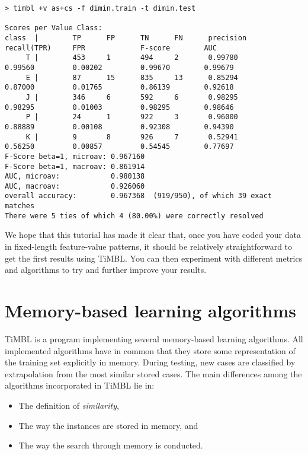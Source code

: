 \documentclass{book}
\begin{document}
{\footnotesize
\begin{verbatim}
> timbl +v as+cs -f dimin.train -t dimin.test

Scores per Value Class:
class  |        TP      FP      TN      FN      precision       recall(TPR)     FPR             F-score        AUC
     T |        453     1       494     2       0.99780         0.99560         0.00202         0.99670        0.99679
     E |        87      15      835     13      0.85294         0.87000         0.01765         0.86139        0.92618
     J |        346     6       592     6       0.98295         0.98295         0.01003         0.98295        0.98646
     P |        24      1       922     3       0.96000         0.88889         0.00108         0.92308        0.94390
     K |        9       8       926     7       0.52941         0.56250         0.00857         0.54545        0.77697
F-Score beta=1, microav: 0.967160
F-Score beta=1, macroav: 0.861914
AUC, microav:            0.980138
AUC, macroav:            0.926060
overall accuracy:        0.967368  (919/950), of which 39 exact matches 
There were 5 ties of which 4 (80.00%) were correctly resolved
\end{verbatim}
}

We hope that this tutorial has made it clear that, once you have coded
your data in fixed-length feature-value patterns, it should be
relatively straightforward to get the first results using TiMBL. You
can then experiment with different metrics and algorithms to try and
further improve your results.

\chapter{Memory-based learning algorithms}
\label{algorithms}

TiMBL is a program implementing several memory-based learning
algorithms. All implemented algorithms have in common that they store some
representation of the training set explicitly in memory. During
testing, new cases are classified by extrapolation from the most
similar stored cases. The main differences among the algorithms
incorporated in TiMBL lie in:

\begin{itemize}
\item The definition of {\em similarity},
\item The way the instances are stored in memory, and
\item The way the search through memory is conducted.
\end{itemize}
\end{document}
